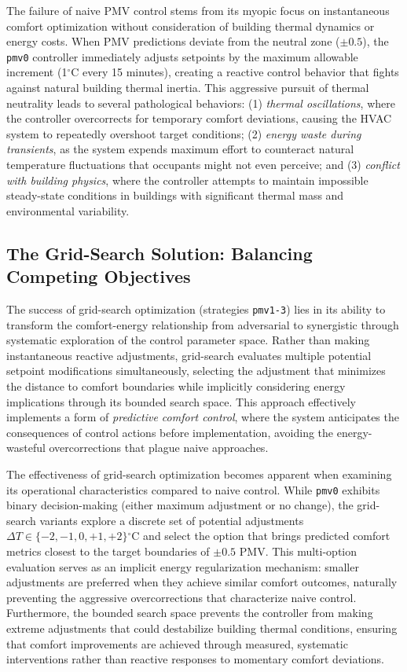 The failure of naive PMV control stems from its myopic focus on instantaneous comfort optimization without consideration of building thermal dynamics or energy costs. When PMV predictions deviate from the neutral zone ($\pm 0.5$), the \texttt{pmv0} controller immediately adjusts setpoints by the maximum allowable increment (1$^\circ$C every 15 minutes), creating a reactive control behavior that fights against natural building thermal inertia. This aggressive pursuit of thermal neutrality leads to several pathological behaviors: (1) \textit{thermal oscillations}, where the controller overcorrects for temporary comfort deviations, causing the HVAC system to repeatedly overshoot target conditions; (2) \textit{energy waste during transients}, as the system expends maximum effort to counteract natural temperature fluctuations that occupants might not even perceive; and (3) \textit{conflict with building physics}, where the controller attempts to maintain impossible steady-state conditions in buildings with significant thermal mass and environmental variability.

\subsection{The Grid-Search Solution: Balancing Competing Objectives}

The success of grid-search optimization (strategies \texttt{pmv1-3}) lies in its ability to transform the comfort-energy relationship from adversarial to synergistic through systematic exploration of the control parameter space. Rather than making instantaneous reactive adjustments, grid-search evaluates multiple potential setpoint modifications simultaneously, selecting the adjustment that minimizes the distance to comfort boundaries while implicitly considering energy implications through its bounded search space. This approach effectively implements a form of \textit{predictive comfort control}, where the system anticipates the consequences of control actions before implementation, avoiding the energy-wasteful overcorrections that plague naive approaches.

The effectiveness of grid-search optimization becomes apparent when examining its operational characteristics compared to naive control. While \texttt{pmv0} exhibits binary decision-making (either maximum adjustment or no change), the grid-search variants explore a discrete set of potential adjustments $\Delta T \in \{-2, -1, 0, +1, +2\}$$^\circ$C and select the option that brings predicted comfort metrics closest to the target boundaries of $\pm 0.5$ PMV. This multi-option evaluation serves as an implicit energy regularization mechanism: smaller adjustments are preferred when they achieve similar comfort outcomes, naturally preventing the aggressive overcorrections that characterize naive control. Furthermore, the bounded search space prevents the controller from making extreme adjustments that could destabilize building thermal conditions, ensuring that comfort improvements are achieved through measured, systematic interventions rather than reactive responses to momentary comfort deviations.

